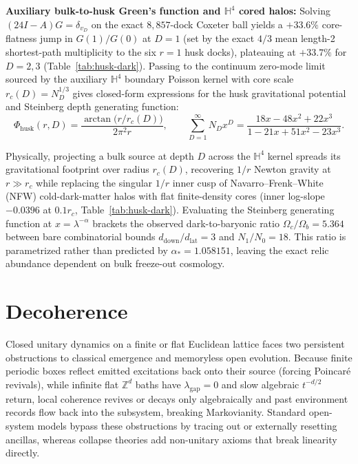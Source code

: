 \textbf{Auxiliary bulk-to-husk Green's function and $\mathbb{H}^4$ cored halos:} Solving $(24I - A) G = \delta_{v_D}$ on
the exact $8{,}857$-dock Coxeter ball yields a $+33.6\%$ core-flatness jump in $G(1)/G(0)$ at $D = 1$ (set by the exact
$4/3$ mean length-2 shortest-path multiplicity to the six $r = 1$ husk docks), plateauing at $+33.7\%$ for $D = 2, 3$
(Table~\ref{tab:husk-dark}). Passing to the continuum zero-mode limit sourced by the auxiliary $\mathbb{H}^4$ boundary
Poisson kernel with core scale $r_c(D) = N_D^{1/3}$ gives closed-form expressions for the husk gravitational potential
and Steinberg depth generating function:
\begin{equation}
\Phi_{\mathrm{husk}}(r, D) = \frac{\arctan\!\bigl(r / r_c(D)\bigr)}{2\pi^2 r},
\qquad
\sum_{D=1}^{\infty} N_D x^D = \frac{18 x - 48 x^2 + 22 x^3}{1 - 21 x + 51 x^2 - 23 x^3}.
\label{eq:halo-gf}
\end{equation}

Physically, projecting a bulk source at depth $D$ across the $\mathbb{H}^4$ kernel spreads its gravitational footprint
over radius $r_c(D)$, recovering $1/r$ Newton gravity at $r \gg r_c$ while replacing the singular $1/r$ inner cusp of
Navarro--Frenk--White (NFW) cold-dark-matter halos with flat finite-density cores (inner log-slope $-0.0396$ at
$0.1 r_c$, Table~\ref{tab:husk-dark}). Evaluating the Steinberg generating function at $x = \lambda^{-\alpha}$ brackets
the observed dark-to-baryonic ratio $\Omega_c / \Omega_b = 5.364$ between bare combinatorial bounds
$d_{\mathrm{down}}/d_{\mathrm{lat}} = 3$ and $N_1 / N_0 = 18$. This ratio is parametrized rather than predicted by
$\alpha_* = 1.058151$, leaving the exact relic abundance dependent on bulk freeze-out cosmology.

\section{Decoherence}
\label{sec:decoherence}

Closed unitary dynamics on a finite or flat Euclidean lattice faces two persistent obstructions to classical emergence
and memoryless open evolution. Because finite periodic boxes reflect emitted excitations back onto their source (forcing
Poincar\'e revivals), while infinite flat $\mathbb{Z}^d$ baths have $\lambda_{\mathrm{gap}} = 0$ and slow algebraic
$t^{-d/2}$ return, local coherence revives or decays only algebraically and past environment records flow back into the
subsystem, breaking Markovianity. Standard open-system models bypass these obstructions by tracing out or externally
resetting ancillas, whereas collapse theories add non-unitary axioms that break linearity directly.

